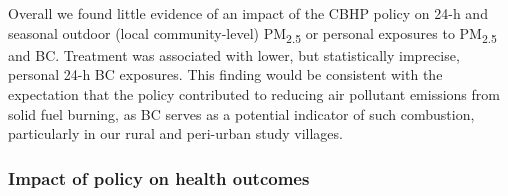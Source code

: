 \documentclass[
  letterpaper,
  DIV=11,
  numbers=noendperiod]{scrartcl}
\begin{document}
Overall we found little evidence of an impact of the CBHP policy on 24-h
and seasonal outdoor (local community-level) PM\textsubscript{2.5} or
personal exposures to PM\textsubscript{2.5} and BC. Treatment was
associated with lower, but statistically imprecise, personal 24-h BC
exposures. This finding would be consistent with the expectation that
the policy contributed to reducing air pollutant emissions from solid
fuel burning, as BC serves as a potential indicator of such combustion,
particularly in our rural and peri-urban study villages.

\hypertarget{impact-of-policy-on-health-outcomes}{%
\subsubsection{Impact of policy on health
outcomes}\label{impact-of-policy-on-health-outcomes}}
\end{document}
